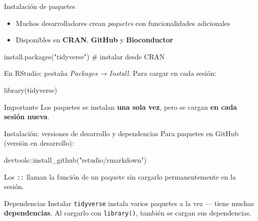 \documentclass[
  9pt,
  ignorenonframetext,
]{beamer}
\newenvironment{Shaded}{\begin{snugshade}}{\end{snugshade}}
\newcommand{\CommentTok}[1]{\textcolor[rgb]{0.37,0.37,0.37}{#1}}
\newcommand{\FunctionTok}[1]{\textcolor[rgb]{0.28,0.35,0.67}{#1}}
\newcommand{\NormalTok}[1]{\textcolor[rgb]{0.00,0.23,0.31}{#1}}
\newcommand{\SpecialCharTok}[1]{\textcolor[rgb]{0.37,0.37,0.37}{#1}}
\newcommand{\StringTok}[1]{\textcolor[rgb]{0.13,0.47,0.30}{#1}}
\providecommand{\tightlist}{%
  \setlength{\itemsep}{0pt}\setlength{\parskip}{0pt}}\usepackage{longtable,booktabs,array}
\begin{document}
\begin{frame}[fragile]{Instalación de paquetes}
\label{instalaciuxf3n-de-paquetes}
\begin{itemize}
\tightlist
\item
  Muchos desarrolladores crean \emph{paquetes} con funcionalidades
  adicionales
\item
  Disponibles en \textbf{CRAN}, \textbf{GitHub} y \textbf{Bioconductor}
\end{itemize}

\begin{Shaded}
\begin{Highlighting}[]
\FunctionTok{install.packages}\NormalTok{(}\StringTok{"tidyverse"}\NormalTok{)   }\CommentTok{\# instalar desde CRAN}
\end{Highlighting}
\end{Shaded}

En RStudio: pestaña \emph{Packages → Install}. Para cargar en cada
sesión:

\begin{Shaded}
\begin{Highlighting}[]
\FunctionTok{library}\NormalTok{(tidyverse)}
\end{Highlighting}
\end{Shaded}

\begin{alertblock}{Importante}
Los paquetes se instalan \textbf{una sola vez}, pero se cargan \textbf{en cada sesión nueva}.
\end{alertblock}
\end{frame}

\begin{frame}[fragile]{Instalación: versiones de desarrollo y
dependencias}
\label{instalaciuxf3n-versiones-de-desarrollo-y-dependencias}
Para paquetes en GitHub (versión en desarrollo):

\begin{Shaded}
\begin{Highlighting}[]
\NormalTok{devtools}\SpecialCharTok{::}\FunctionTok{install\_github}\NormalTok{(}\StringTok{"rstudio/rmarkdown"}\NormalTok{)}
\end{Highlighting}
\end{Shaded}

Los \texttt{::} llaman la función de un paquete sin cargarlo
permanentemente en la sesión.

\medskip

\begin{block}{Dependencias}
Instalar \texttt{tidyverse} instala varios paquetes a la vez — tiene muchas \textbf{dependencias}. Al cargarlo con \texttt{library()}, también se cargan sus dependencias.
\end{block}
\end{frame}
\end{document}
